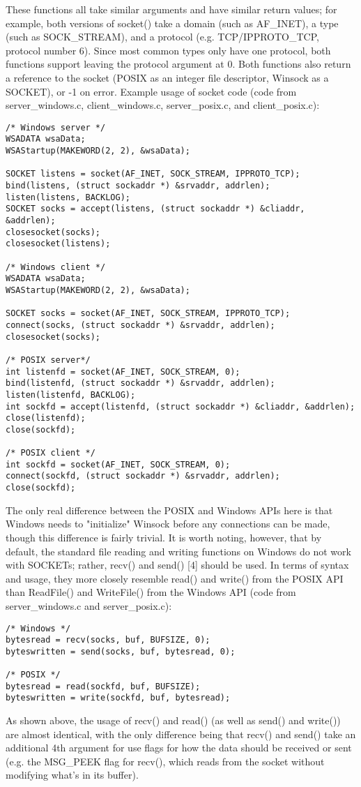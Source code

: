 \documentclass[letterpaper,10pt,fleqn]{article}
\numberwithin{equation}{section}
\begin{document}
These functions all take similar arguments and have similar return values; for example, both versions of socket() take a domain (such as AF\_INET), a type (such as SOCK\_STREAM), and a protocol (e.g. TCP/IPPROTO\_TCP, protocol number 6).  Since most common types only have one protocol, both functions support leaving the protocol argument at 0.  Both functions also return a reference to the socket (POSIX as an integer file descriptor, Winsock as a SOCKET), or -1 on error.  Example usage of socket code (code from server\_windows.c, client\_windows.c, server\_posix.c, and client\_posix.c):
\begin{verbatim}
/* Windows server */
WSADATA wsaData;
WSAStartup(MAKEWORD(2, 2), &wsaData);

SOCKET listens = socket(AF_INET, SOCK_STREAM, IPPROTO_TCP);
bind(listens, (struct sockaddr *) &srvaddr, addrlen);
listen(listens, BACKLOG);
SOCKET socks = accept(listens, (struct sockaddr *) &cliaddr, &addrlen);
closesocket(socks);
closesocket(listens);

/* Windows client */
WSADATA wsaData;
WSAStartup(MAKEWORD(2, 2), &wsaData);

SOCKET socks = socket(AF_INET, SOCK_STREAM, IPPROTO_TCP);
connect(socks, (struct sockaddr *) &srvaddr, addrlen);
closesocket(socks);

/* POSIX server*/
int listenfd = socket(AF_INET, SOCK_STREAM, 0);
bind(listenfd, (struct sockaddr *) &srvaddr, addrlen);
listen(listenfd, BACKLOG);
int sockfd = accept(listenfd, (struct sockaddr *) &cliaddr, &addrlen);
close(listenfd);
close(sockfd);

/* POSIX client */
int sockfd = socket(AF_INET, SOCK_STREAM, 0);
connect(sockfd, (struct sockaddr *) &srvaddr, addrlen);
close(sockfd);
\end{verbatim}
The only real difference between the POSIX and Windows APIs here is that Windows needs to "initialize" Winsock before any connections can be made, though this difference is fairly trivial.  It is worth noting, however, that by default, the standard file reading and writing functions on Windows do not work with SOCKETs; rather, recv() and send() {[}4{]} should be used.  In terms of syntax and usage, they more closely resemble read() and write() from the POSIX API than ReadFile() and WriteFile() from the Windows API (code from server\_windows.c and server\_posix.c):
\begin{verbatim}
/* Windows */
bytesread = recv(socks, buf, BUFSIZE, 0);
byteswritten = send(socks, buf, bytesread, 0);

/* POSIX */
bytesread = read(sockfd, buf, BUFSIZE);
byteswritten = write(sockfd, buf, bytesread);
\end{verbatim}
As shown above, the usage of recv() and read() (as well as send() and write()) are almost identical, with the only difference being that recv() and send() take an additional 4th argument for use flags for how the data should be received or sent (e.g. the MSG\_PEEK flag for recv(), which reads from the socket without modifying what's in its buffer).
\end{document}
